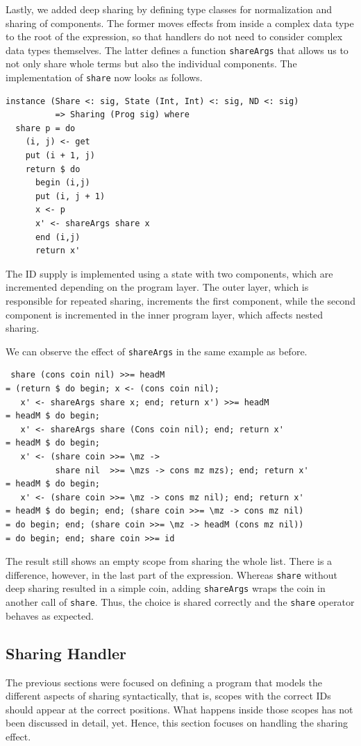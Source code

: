 \documentclass[a4paper, 11pt, fleqn, twoside]{scrreprt}
\newcommand{\hinl}[1]{\texttt{#1}}
\begin{document}
Lastly, we added deep sharing by defining type classes for normalization and sharing of components.
The former moves effects from inside a complex data type to the root of the expression, so that handlers do not need to consider complex data types themselves.
The latter defines a function \hinl{shareArgs} that allows us to not only share whole terms but also the individual components.
The implementation of \hinl{share} now looks as follows.

\begin{verbatim}
instance (Share <: sig, State (Int, Int) <: sig, ND <: sig) 
          => Sharing (Prog sig) where
  share p = do
    (i, j) <- get
    put (i + 1, j)
    return $ do
      begin (i,j)
      put (i, j + 1)
      x <- p
      x' <- shareArgs share x
      end (i,j)
      return x'
\end{verbatim}

The ID supply is implemented using a state with two components, which are incremented depending on the program layer.
The outer layer, which is responsible for repeated sharing, increments the first component, while the second component is incremented in the inner program layer, which affects nested sharing.

We can observe the effect of \hinl{shareArgs} in the same example as before.

\begin{verbatim}
 share (cons coin nil) >>= headM
= (return $ do begin; x <- (cons coin nil); 
   x' <- shareArgs share x; end; return x') >>= headM
= headM $ do begin; 
   x' <- shareArgs share (Cons coin nil); end; return x'
= headM $ do begin; 
   x' <- (share coin >>= \mz -> 
          share nil  >>= \mzs -> cons mz mzs); end; return x'
= headM $ do begin; 
   x' <- (share coin >>= \mz -> cons mz nil); end; return x'
= headM $ do begin; end; (share coin >>= \mz -> cons mz nil)
= do begin; end; (share coin >>= \mz -> headM (cons mz nil))
= do begin; end; share coin >>= id
\end{verbatim}

The result still shows an empty scope from sharing the whole list.
There is a difference, however, in the last part of the expression.
Whereas \hinl{share} without deep sharing resulted in a simple coin, adding \hinl{shareArgs} wraps the coin in another call of \hinl{share}.
Thus, the choice is shared correctly and the \hinl{share} operator behaves as expected.

\subsection{Sharing Handler}
The previous sections were focused on defining a program that models the different aspects of sharing syntactically, that is, scopes with the correct IDs should appear at the correct positions.
What happens inside those scopes has not been discussed in detail, yet.
Hence, this section focuses on handling the sharing effect.
\end{document}
